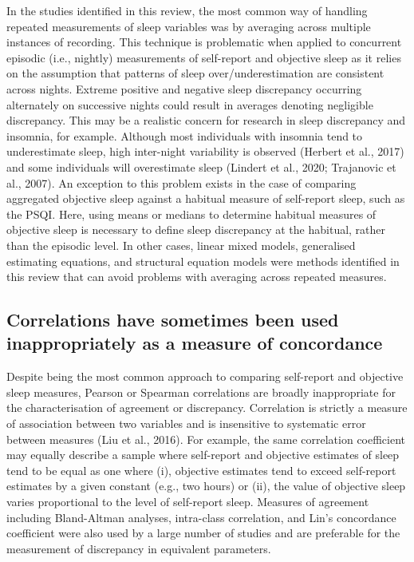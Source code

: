 \documentclass[
]{article}
\begin{document}
In the studies identified in this review, the most common way of handling repeated measurements of sleep variables was by averaging across multiple instances of recording. This technique is problematic when applied to concurrent episodic (i.e., nightly) measurements of self-report and objective sleep as it relies on the assumption that patterns of sleep over/underestimation are consistent across nights. Extreme positive and negative sleep discrepancy occurring alternately on successive nights could result in averages denoting negligible discrepancy. This may be a realistic concern for research in sleep discrepancy and insomnia, for example. Although most individuals with insomnia tend to underestimate sleep, high inter-night variability is observed (Herbert et al., 2017) and some individuals will overestimate sleep (Lindert et al., 2020; Trajanovic et al., 2007). An exception to this problem exists in the case of comparing aggregated objective sleep against a habitual measure of self-report sleep, such as the PSQI. Here, using means or medians to determine habitual measures of objective sleep is necessary to define sleep discrepancy at the habitual, rather than the episodic level. In other cases, linear mixed models, generalised estimating equations, and structural equation models were methods identified in this review that can avoid problems with averaging across repeated measures.

\subsection{Correlations have sometimes been used inappropriately as a measure of concordance}\label{correlations-have-sometimes-been-used-inappropriately-as-a-measure-of-concordance}

Despite being the most common approach to comparing self-report and objective sleep measures, Pearson or Spearman correlations are broadly inappropriate for the characterisation of agreement or discrepancy. Correlation is strictly a measure of association between two variables and is insensitive to systematic error between measures (Liu et al., 2016). For example, the same correlation coefficient may equally describe a sample where self-report and objective estimates of sleep tend to be equal as one where (i), objective estimates tend to exceed self-report estimates by a given constant (e.g., two hours) or (ii), the value of objective sleep varies proportional to the level of self-report sleep. Measures of agreement including Bland-Altman analyses, intra-class correlation, and Lin's concordance coefficient were also used by a large number of studies and are preferable for the measurement of discrepancy in equivalent parameters.
\end{document}
